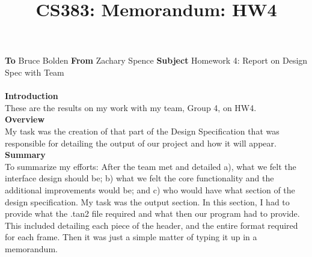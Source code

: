 \documentclass[12pt]{article}
\title{CS383: Memorandum: HW4}
\begin{document}
\maketitle
\noindent \textbf{To}  Bruce Bolden \newline \textbf{From}  Zachary Spence \newline \textbf{Subject}  Homework 4: Report on Design Spec with Team\\\\
\textbf{Introduction}\\
These are the results on my work with my team, Group 4, on HW4.\\

\noindent \textbf{Overview}\\
My task was the creation of that part of the Design Specification that was responsible for detailing the output of our project and how it will appear.\\

\noindent \textbf{Summary}\\
To summarize my efforts: After the team met and detailed a), what we felt the interface design should be; b) what we felt the core functionality and the additional improvements would be; and c) who would have what section of the design specification.  My task was the output section.  In this section, I had to provide what the .tan2 file required and what then our program had to provide.  This included detailing each piece of the header, and the entire format required for each frame.  Then it was just a simple matter of typing it up in a memorandum.\\
\end{document}
